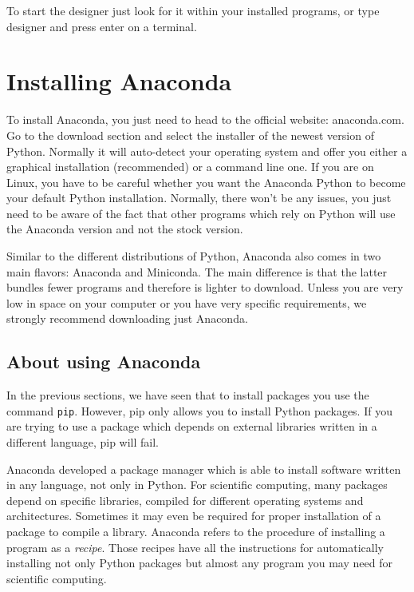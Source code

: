 To start the designer just look for it within your installed programs, or type designer and press enter on a terminal. 

\section{Installing Anaconda}
To install Anaconda, you just need to head to the official website: anaconda.com. Go to the download section and select the installer of the newest version of Python. Normally it will auto-detect your operating system and offer you either a graphical installation (recommended) or a command line one. If you are on Linux, you have to be careful whether you want the Anaconda Python to become your default Python installation. Normally, there won't be any issues, you just need to be aware of the fact that other programs which rely on Python will use the Anaconda version and not the stock version. 

Similar to the different distributions of Python, Anaconda also comes in two main flavors: Anaconda and Miniconda. The main difference is that the latter bundles fewer programs and therefore is lighter to download. Unless you are very low in space on your computer or you have very specific requirements, we strongly recommend downloading just Anaconda. 

\subsection{About using Anaconda}
In the previous sections, we have seen that to install packages you use the command \texttt{pip}. However, pip only allows you to install Python packages. If you are trying to use a package which depends on external libraries written in a different language, pip will fail. 


Anaconda developed a package manager which is able to install software written in any language, not only in Python. For scientific computing, many packages depend on specific libraries, compiled for different operating systems and architectures. Sometimes it may even be required for proper installation of a package to compile a library. Anaconda refers to the procedure of installing a program as a \emph{recipe}. Those recipes have all the instructions for automatically installing not only Python packages but almost any program you may need for scientific computing. 

